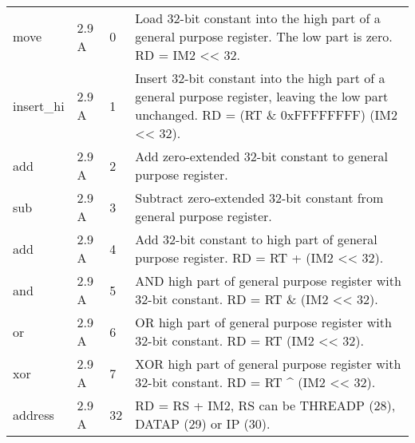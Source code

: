 \documentclass[forwardcom.tex]{subfiles}
\begin{document}
\begin{longtable} {|p{25mm}|p{14mm}|p{10mm}|p{95mm}|}
move          & 2.9 A &  0  & Load 32-bit constant into the high part of a general purpose register. The low part is zero. RD = IM2 \textless\textless{} 32. \\
insert\_hi    & 2.9 A &  1  & Insert 32-bit constant into the high part of a general purpose register, leaving the low part unchanged.
RD = (RT \& 0xFFFFFFFF) \textbar{} (IM2 \textless\textless{} 32). \\
add           & 2.9 A &  2  & Add zero-extended 32-bit constant to general purpose register. \\
sub           & 2.9 A &  3  & Subtract zero-extended 32-bit constant from general purpose register. \\
add           & 2.9 A &  4  & Add 32-bit constant to high part of general purpose register. RD = RT + (IM2 \textless\textless{} 32). \\
and           & 2.9 A &  5  & AND high part of general purpose register with 32-bit constant. RD = RT \& (IM2 \textless\textless{} 32). \\
or            & 2.9 A &  6  & OR high part of general purpose register with 32-bit constant. RD = RT \textbar{} (IM2 \textless\textless{} 32). \\
xor           & 2.9 A &  7  & XOR high part of general purpose register with 32-bit constant. RD = RT \^{} (IM2 \textless\textless{} 32). \\
address       & 2.9 A & 32  & RD = RS + IM2, RS can be THREADP (28), DATAP (29) or IP (30). \\
\hline
\end{longtable}
\end{document}
